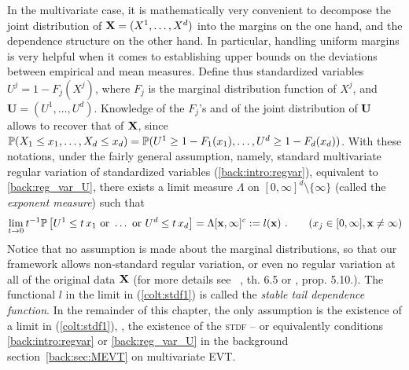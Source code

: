 In the multivariate case, it is mathematically very convenient to decompose the joint
distribution of $\mb X = (X^1,\ldots, X^d)$  %
into the margins on the
one hand, and the dependence structure on the other hand. In
particular, handling uniform margins is very helpful when it comes
to establishing upper bounds on the deviations between empirical and mean
 measures. Define thus  standardized variables $U^j = 1 - F_j(X^j)$,
 where $F_j$ is the marginal distribution function of $X^j$, and
 $\mathbf{U} = (U^1,\dotsc,U^d)$. Knowledge of the $F_j$'s and of the
 joint distribution of $\mb U$ allows to recover that of $\mb X$, %
 since  $\P(X_1\le x_1,\ldots, X_d\le x_d) = \P(U^1 \ge
 1 -  F_1(x_1),\ldots,U^d\ge 1-F_d(x_d))$.  %
  With these notations,  under the fairly general assumption, namely, standard multivariate regular variation of standardized variables (\ref{back:intro:regvar}), equivalent to \eqref{back:reg_var_U}, there exists a limit measure
$\Lambda$ on $[0,\infty]^d \setminus\{\infty\}$ (called the
\emph{exponent measure}) such that 
\begin{align}
\label{colt:stdf1}
\lim_{t \to 0} t^{-1} \mathbb{P} \left[
 U^1 \le t\, x_1
   ~\text{or}~ \ldots ~\text{or}~ U^d \le t\,x_d  \right]
 = \Lambda[\mb x, \infty]^c :=l(\mb x)~. \qquad(x_j\in[0,\infty], \mb x\neq\infty)
\end{align}
Notice that no assumption is made about the marginal distributions, so that our framework allows non-standard regular variation, or even no regular variation at all of the original data $\mb X$ (for more details see \eg~\cite{Resnick2007}, th. 6.5 or \cite{Resnick1987}, prop. 5.10.).
The functional $l$ in the limit in (\ref{colt:stdf1}) is called the \emph{stable tail
  dependence function}. 
In the remainder of this chapter, the only assumption is the existence
of a limit in (\ref{colt:stdf1}), \ie, the existence of the \textsc{stdf} -- or equivalently conditions \eqref{back:intro:regvar} or \eqref{back:reg_var_U} in the background section~\ref{back:sec:MEVT} on multivariate EVT.



